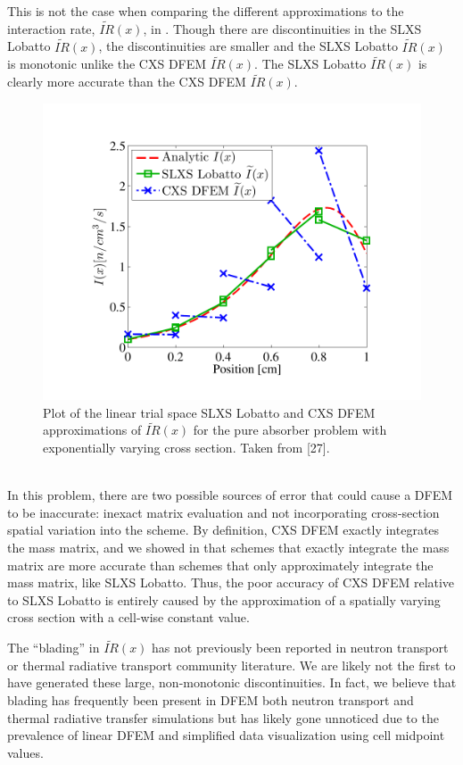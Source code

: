 \newpage
This is not the case when comparing the different approximations to the interaction rate, $\widetilde{IR}(x)$, in .  
Though there are discontinuities in the SLXS Lobatto $\widetilde{IR}(x)$, the discontinuities are smaller and the SLXS Lobatto $\widetilde{IR}(x)$ is monotonic unlike the CXS DFEM $\widetilde{IR}(x)$.   
The SLXS Lobatto $\widetilde{IR}(x)$ is clearly more accurate than the CXS DFEM $\widetilde{IR}(x)$.
%
\begin{figure}[!htp]
\centering
\includegraphics[width=12cm,trim=0.75in  0.4in 0.75in 0.6in,clip=true]{chapter3_variable_xs/SLXS_I_Profile.pdf}
\caption{Plot of the linear trial space SLXS Lobatto and CXS DFEM approximations of $\widetilde{IR}(x)$ for the pure absorber problem with exponentially varying cross section.  Taken from [27].}
\label{fig:lobatto_blades_ir}
\end{figure}
%
%
\\
In this problem, there are two possible sources of error that could cause a DFEM to be inaccurate: inexact matrix evaluation and not incorporating cross-section spatial variation into the scheme.
By definition, CXS DFEM exactly integrates the mass matrix, and we showed in  that schemes that exactly integrate the mass matrix are more accurate than schemes that only approximately integrate the mass matrix, like SLXS Lobatto.
Thus, the poor accuracy of CXS DFEM relative to SLXS Lobatto is entirely caused by the approximation of a spatially varying cross section with a cell-wise constant value.

The ``blading'' in $\widetilde{IR}(x)$ has not previously been reported in neutron transport or thermal radiative transport community literature.
We are likely not the first to have generated these large, non-monotonic discontinuities. 
In fact, we believe that blading has frequently been present in DFEM both neutron transport and thermal radiative transfer simulations but has likely gone unnoticed due to the prevalence of linear DFEM and simplified data visualization using cell midpoint values.

